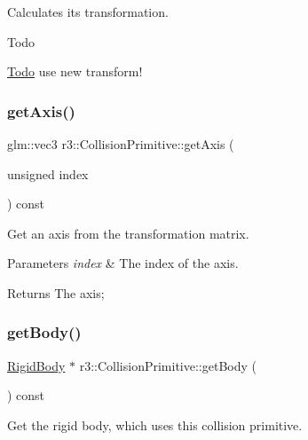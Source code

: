 Calculates its transformation. 

\begin{DoxyRefDesc}{Todo}
\item[\mbox{\hyperlink{todo__todo000015}{Todo}}]use new transform! \end{DoxyRefDesc}
\mbox{\label{classr3_1_1_collision_primitive_a78c959f5ca0a09a0fc2038ac7f30e45a}} 
\subsubsection{\texorpdfstring{get\+Axis()}{getAxis()}}
{\footnotesize\ttfamily glm\+::vec3 r3\+::\+Collision\+Primitive\+::get\+Axis (\begin{DoxyParamCaption}\item[{unsigned}]{index }\end{DoxyParamCaption}) const}



Get an axis from the transformation matrix. 


\begin{DoxyParams}{Parameters}
{\em index} & The index of the axis. \\
\hline
\end{DoxyParams}
\begin{DoxyReturn}{Returns}
The axis; 
\end{DoxyReturn}
\mbox{\label{classr3_1_1_collision_primitive_af8dbda90cce34a6262309cbdb75feea7}} 
\subsubsection{\texorpdfstring{get\+Body()}{getBody()}}
{\footnotesize\ttfamily \mbox{\hyperlink{classr3_1_1_rigid_body}{Rigid\+Body}} $\ast$ r3\+::\+Collision\+Primitive\+::get\+Body (\begin{DoxyParamCaption}{ }\end{DoxyParamCaption}) const}



Get the rigid body, which uses this collision primitive. 


